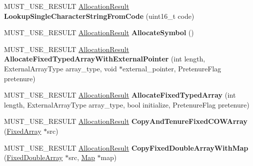 \begin{DoxyCompactItemize}
\item 
M\+U\+S\+T\+\_\+\+U\+S\+E\+\_\+\+R\+E\+S\+U\+LT \hyperlink{classv8_1_1internal_1_1_allocation_result}{Allocation\+Result} {\bfseries Lookup\+Single\+Character\+String\+From\+Code} (uint16\+\_\+t code)\hypertarget{classv8_1_1internal_1_1_heap_afb5183a2ef09aa0907aaab756660e284}{}\label{classv8_1_1internal_1_1_heap_afb5183a2ef09aa0907aaab756660e284}

\item 
M\+U\+S\+T\+\_\+\+U\+S\+E\+\_\+\+R\+E\+S\+U\+LT \hyperlink{classv8_1_1internal_1_1_allocation_result}{Allocation\+Result} {\bfseries Allocate\+Symbol} ()\hypertarget{classv8_1_1internal_1_1_heap_ac55fed3dfb9a1a3151c0d76c6b53740a}{}\label{classv8_1_1internal_1_1_heap_ac55fed3dfb9a1a3151c0d76c6b53740a}

\item 
M\+U\+S\+T\+\_\+\+U\+S\+E\+\_\+\+R\+E\+S\+U\+LT \hyperlink{classv8_1_1internal_1_1_allocation_result}{Allocation\+Result} {\bfseries Allocate\+Fixed\+Typed\+Array\+With\+External\+Pointer} (int length, External\+Array\+Type array\+\_\+type, void $\ast$external\+\_\+pointer, Pretenure\+Flag pretenure)\hypertarget{classv8_1_1internal_1_1_heap_ae58b90d0d7ba72ec56c772aa259a79d8}{}\label{classv8_1_1internal_1_1_heap_ae58b90d0d7ba72ec56c772aa259a79d8}

\item 
M\+U\+S\+T\+\_\+\+U\+S\+E\+\_\+\+R\+E\+S\+U\+LT \hyperlink{classv8_1_1internal_1_1_allocation_result}{Allocation\+Result} {\bfseries Allocate\+Fixed\+Typed\+Array} (int length, External\+Array\+Type array\+\_\+type, bool initialize, Pretenure\+Flag pretenure)\hypertarget{classv8_1_1internal_1_1_heap_a8c6615c9d58973f4ff167f3714d082bb}{}\label{classv8_1_1internal_1_1_heap_a8c6615c9d58973f4ff167f3714d082bb}

\item 
M\+U\+S\+T\+\_\+\+U\+S\+E\+\_\+\+R\+E\+S\+U\+LT \hyperlink{classv8_1_1internal_1_1_allocation_result}{Allocation\+Result} {\bfseries Copy\+And\+Tenure\+Fixed\+C\+O\+W\+Array} (\hyperlink{classv8_1_1internal_1_1_fixed_array}{Fixed\+Array} $\ast$src)\hypertarget{classv8_1_1internal_1_1_heap_a83f8eda21fe9aa2440ab5296a1e073c9}{}\label{classv8_1_1internal_1_1_heap_a83f8eda21fe9aa2440ab5296a1e073c9}

\item 
M\+U\+S\+T\+\_\+\+U\+S\+E\+\_\+\+R\+E\+S\+U\+LT \hyperlink{classv8_1_1internal_1_1_allocation_result}{Allocation\+Result} {\bfseries Copy\+Fixed\+Double\+Array\+With\+Map} (\hyperlink{classv8_1_1internal_1_1_fixed_double_array}{Fixed\+Double\+Array} $\ast$src, \hyperlink{classv8_1_1internal_1_1_map}{Map} $\ast$map)\hypertarget{classv8_1_1internal_1_1_heap_ae2294cd0a86b98ca8546837a15099470}{}\label{classv8_1_1internal_1_1_heap_ae2294cd0a86b98ca8546837a15099470}


\end{DoxyCompactItemize}
